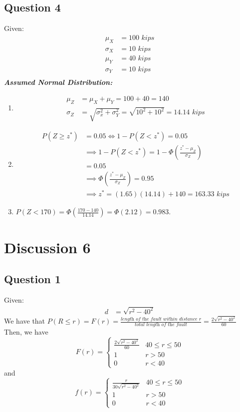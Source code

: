 \documentclass[13pt]{article}
\begin{document}
\subsection*{Question 4}
Given:
\begin{align*}
  \mu_X &= 100 \textit{ kips} \\
  \sigma_X &= 10 \textit{ kips} \\
  \mu_Y &= 40 \textit{ kips} \\
  \sigma_Y &= 10 \textit{ kips} \\
\end{align*}
\textit{\textbf{Assumed Normal Distribution:}}
\begin{enumerate}[label=(\alph*)]
\item
  \begin{align*}
    \mu_Z &= \mu_X + \mu_Y = 100 + 40 = 140 \\
    \sigma_Z &= \sqrt{\sigma_x^2 + \sigma_Y^2} = \sqrt{10^2 + 10^2} = 14.14 \textit{ kips}
  \end{align*}
\item
  \begin{align*}
    P(Z \geq z^*) &= 0.05 \iff 1 - P(Z < z^*) = 0.05 \\
                  &\implies 1 - P(Z < z^*) = 1 - \Phi \left( \frac{z^* - \mu_Z}{\sigma_Z} \right) \\
                  &= 0.05 \\
                  &\implies \Phi \left( \frac{z^* - \mu_Z}{\sigma_Z} \right) = 0.95 \\
                  &\implies z^* = (1.65)(14.14) + 140 = 163.33 \textit{ kips}
  \end{align*}
\item $P(Z < 170) = \Phi \left(\frac{170 - 140}{14.14} \right) = \Phi(2.12) = 0.983$.
\end{enumerate}

\newpage
\section*{Discussion 6}
\subsection*{Question 1}
Given:
\begin{align*}
  d &= \sqrt{r^2 - 40^2}  
\end{align*}
We have that $P(R \leq r) = F(r) = \frac{\textit{length of the fault within distance } r}
{\textit{total length of the fault}} = \frac{2\sqrt{r^2 - 40^2}}{60}$
Then, we have
\[F(r) =
  \begin{cases}
    \frac{2\sqrt{r^2 - 40^2}}{60} & 40 \leq r \leq 50 \\
    1 & r > 50 \\
    0 & r < 40
  \end{cases}
\]
and
\[f(r) =
  \begin{cases}
    \frac{r}{30 \sqrt{r^2 - 40^2}} & 40 \leq r \leq 50 \\
    1 & r > 50 \\
    0 & r < 40
  \end{cases}
\]
\end{document}
